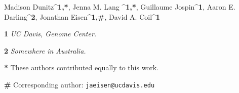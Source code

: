 Madison Dunitz^{\textbf{1,*}}, Jenna M. Lang ^{\textbf{1,*}}, Guillaume Jospin^{\textbf{1}}, Aaron E. Darling^{\textbf{2}}, Jonathan Eisen^{\textbf{1,#}}, David A. Coil^{\textbf{1}} 

\textbf{1} \textit{UC Davis, Genome Center.}

\textbf{2} \textit{Somewhere in Australia.}

\textbf{*} These authors contributed equally to this work.

\textbf{#} Corresponding author: \verb|jaeisen@ucdavis.edu|